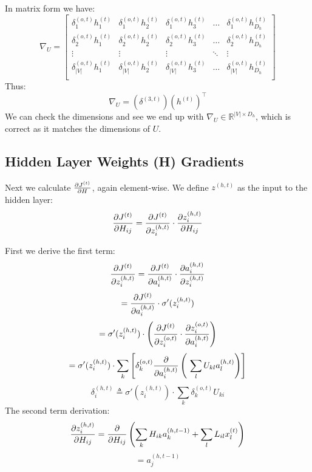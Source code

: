 \documentclass[]{article}
\newcommand{\deriv}[2]{%
	\ensuremath{\frac{\partial {#1}}{\partial {#2}}}}
\newcommand{\slayer}[3]{ %
	\ensuremath{{#1}^{(#2)}_{#3}}}
\newcommand{\vlayer}[2]{ %
	\ensuremath{{#1}^{(#2)}}}
\newcommand{\reals}[1]{ %
	\ensuremath{\in \mathbb{R}^{#1}}}
\begin{document}
In matrix form we have:
\[
\nabla_{U} = 
\begin{bmatrix}
\slayer{\delta}{o,t}{1}\slayer{h}{t}{1}       & \slayer{\delta}{o,t}{1}\slayer{h}{t}{2} & \slayer{\delta}{o,t}{1}\slayer{h}{t}{3} & \dots & \slayer{\delta}{o,t}{1}\slayer{h}{t}{D_h} \\
\slayer{\delta}{o,t}{2}\slayer{h}{t}{1}       & \slayer{\delta}{o,t}{2}\slayer{h}{t}{2} & \slayer{\delta}{o,t}{2}\slayer{h}{t}{3} & \dots & \slayer{\delta}{o,t}{2}\slayer{h}{t}{D_h} \\
\vdots	& \vdots	&\vdots	&\ddots	& \vdots \\
\slayer{\delta}{o,t}{|V|}\slayer{h}{t}{1}       & \slayer{\delta}{o,t}{|V|}\slayer{h}{t}{2} & \slayer{\delta}{o,t}{|V|}\slayer{h}{t}{3} & \dots & \slayer{\delta}{o,t}{|V|}\slayer{h}{t}{D_h} \\
\end{bmatrix}
\]
Thus:
\begin{equation} \label{eq:d3,t}
\nabla_U = (\vlayer{\delta}{3,t})(\vlayer{h}{t})^\top
\end{equation}We can check the dimensions and see we end up with $\nabla_U \reals{|V| \times D_h}$, which is correct as it matches the dimensions of $U$.

\subsection{Hidden Layer Weights (H) Gradients}\label{subsection_Ht}
Next we calculate \deriv{\vlayer{J}{t}}{H}, again element-wise. We define $\vlayer{z}{h,t}$ as the input to the hidden layer:
$$\deriv{\vlayer{J}{t}}{H_{ij}} = \deriv{\vlayer{J}{t}}{\slayer{z}{h,t}{i}} \cdot \deriv{\slayer{z}{h,t}{i}}{H_{ij}}$$

First we derive the first term:
$$\deriv{\vlayer{J}{t}}{\slayer{z}{h,t}{i}} = \deriv{\vlayer{J}{t}}{\slayer{a}{h,t}{i}}\cdot\deriv{\slayer{a}{h,t}{i}}{\slayer{z}{h,t}{i}}$$
$$= \deriv{\vlayer{J}{t}}{\slayer{a}{h,t}{i}} \cdot \sigma'(\slayer{z}{h,t}{i})$$
$$= \sigma'(\slayer{z}{h,t}{i})\cdot \left(\deriv{\vlayer{J}{t}}{\slayer{z}{o,t}{i}}\cdot\deriv{\slayer{z}{o,t}{i}}{\slayer{a}{h,t}{i}}\right)$$
$$ = \sigma'(\slayer{z}{h,t}{i})\cdot \sum_k \left[\slayer{\delta}{o,t}{k} \deriv{}{\slayer{a}{h,t}{i}}\left(\ \sum_l U_{kl} \slayer{a}{h,t}{l} \right)\right]$$
$$ \slayer{\delta}{h,t}{i} \triangleq \sigma'(\slayer{z}{h,t}{i}) \cdot \sum_k \slayer{\delta}{o,t}{k} U_{ki}$$
The second term derivation:
$$\deriv{\slayer{z}{h,t}{i}}{H_{ij}} = \deriv{}{H_{ij}}\left(\sum_k H_{ik}\slayer{a}{h,t-1}{k} + \sum_l L_{il}\slayer{x}{t}{l}\right)$$
$$= \slayer{a}{h,t-1}{j}$$
\end{document}
